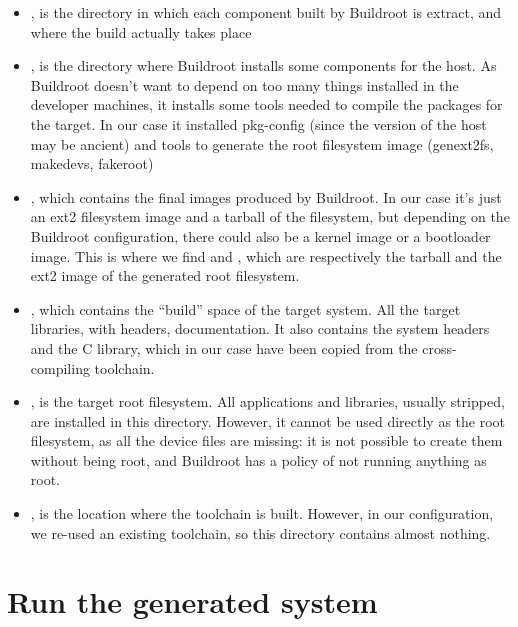 \begin{itemize}

\item {}, is the directory in which each component built by
  Buildroot is extract, and where the build actually takes place

\item {}, is the directory where Buildroot installs some
  components for the host. As Buildroot doesn't want to depend on too
  many things installed in the developer machines, it installs some
  tools needed to compile the packages for the target. In our case it
  installed pkg-config (since the version of the host may be ancient)
  and tools to generate the root filesystem image (genext2fs,
  makedevs, fakeroot)

\item {}, which contains the final images produced by
  Buildroot. In our case it's just an ext2 filesystem image and a
  tarball of the filesystem, but depending on the Buildroot
  configuration, there could also be a kernel image or a bootloader
  image. This is where we find  and
  , which are respectively the tarball and the ext2
  image of the generated root filesystem.

\item {}, which contains the “build” space of the target
  system. All the target libraries, with headers, documentation. It
  also contains the system headers and the C library, which in our
  case have been copied from the cross-compiling toolchain.

\item {}, is the target root filesystem. All applications
  and libraries, usually stripped, are installed in this
  directory. However, it cannot be used directly as the root
  filesystem, as all the device files are missing: it is not possible
  to create them without being root, and Buildroot has a policy of not
  running anything as root.

\item {}, is the location where the toolchain is
  built. However, in our configuration, we re-used an existing
  toolchain, so this directory contains almost nothing.

\end{itemize}

\section{Run the generated system}

